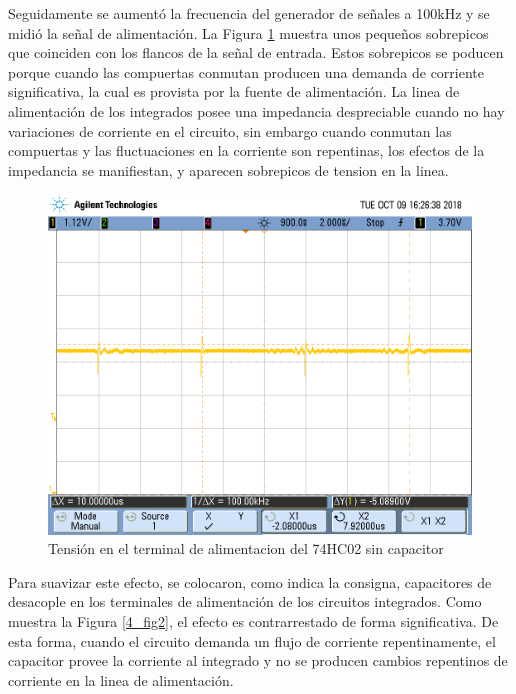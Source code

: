 \bigskip
Seguidamente se aumentó la frecuencia del generador de señales a 100kHz y se midió la señal de alimentación. La Figura \ref{4_fig1} muestra unos pequeños sobrepicos que coinciden con los flancos de la señal de entrada. Estos sobrepicos se poducen porque cuando las compuertas conmutan producen una demanda de corriente significativa, la cual es provista por la fuente de alimentación. La linea de alimentación de los integrados posee una impedancia despreciable cuando no hay variaciones de corriente en el circuito, sin embargo cuando conmutan las compuertas y las fluctuaciones en la corriente son repentinas, los efectos de la impedancia se manifiestan, y aparecen sobrepicos de tension en la linea.
\begin{figure}[H]
\centering
\includegraphics[scale=0.2]{imagenes/sin_capacitor.png}
\caption{Tensión en el terminal de alimentacion del 74HC02 sin capacitor}
\label{4_fig1} 
\end{figure}

Para suavizar este efecto, se colocaron, como indica la consigna, capacitores de desacople en los terminales de alimentación de los circuitos integrados. Como muestra la Figura \ref{4_fig2}, el efecto es contrarrestado de forma significativa. De esta forma, cuando el circuito demanda un flujo de corriente repentinamente, el capacitor provee la corriente al integrado y no se producen cambios repentinos de corriente en la linea de alimentación.

